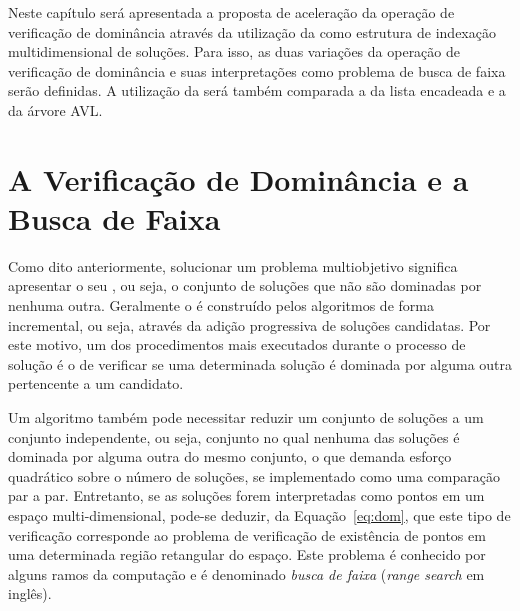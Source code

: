 Neste capítulo será apresentada a proposta de aceleração da operação de verificação de dominância
através da utilização da \kdtree{} como estrutura de indexação multidimensional de soluções.
Para isso, as duas variações da operação de verificação de dominância e suas
interpretações como problema de busca de faixa serão definidas.
A utilização da \kdtree{} será também comparada a da lista encadeada e a da árvore AVL.

\section{A Verificação de Dominância e a Busca de Faixa}

Como dito anteriormente, solucionar um problema multiobjetivo significa
apresentar o seu \paretoset{}, ou seja, o conjunto de soluções que
não são dominadas por nenhuma outra.
Geralmente o \paretoset{} é construído pelos algoritmos de forma incremental, ou seja,
através da adição progressiva de soluções candidatas.
Por este motivo, um dos procedimentos mais executados durante o processo de solução
é o de verificar se uma determinada solução é dominada por alguma outra
pertencente a um \paretoset{} candidato.

Um algoritmo também pode necessitar reduzir um conjunto de soluções
a um conjunto independente, ou seja, conjunto no qual nenhuma das soluções é dominada por
alguma outra do mesmo conjunto, o que demanda esforço quadrático sobre o número de soluções,
se implementado como uma comparação par a par.
Entretanto, se as soluções forem interpretadas como pontos em um espaço
multi-dimensional, pode-se deduzir, da Equação~\ref{eq:dom}, que este tipo de verificação
corresponde ao problema de verificação de existência de pontos em uma determinada
região retangular do espaço.
Este problema é conhecido por alguns ramos da computação e é denominado \emph{busca de faixa}
(\emph{range search} em inglês).


